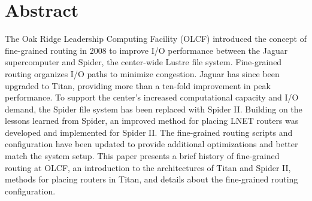 \section{Abstract}

The Oak Ridge Leadership Computing Facility (OLCF) introduced the concept of
fine-grained routing in 2008 to improve I/O performance between the Jaguar
supercomputer and Spider, the center-wide Lustre file system. Fine-grained
routing organizes I/O paths to minimize congestion. Jaguar has since been
upgraded to Titan, providing more than a ten-fold improvement in peak
performance. To support the center's increased computational capacity and I/O
demand, the Spider file system has been replaced with Spider II. Building on
the lessons learned from Spider, an improved method for placing LNET routers
was developed and implemented for Spider II. The fine-grained routing scripts
and configuration have been updated to provide additional optimizations and
better match the system setup. This paper presents a brief history of
fine-grained routing at OLCF, an introduction to the architectures of Titan and
Spider II, methods for placing routers in Titan, and details about the
fine-grained routing configuration.

